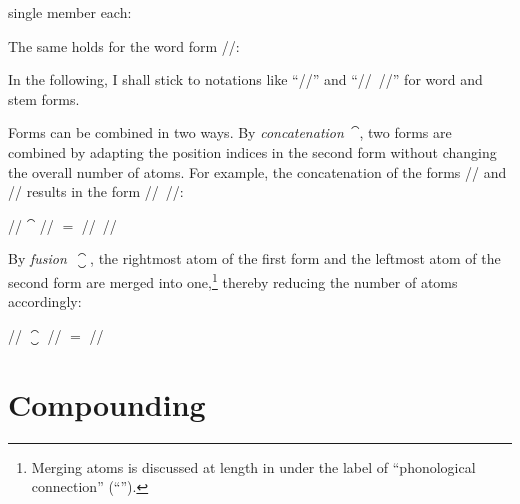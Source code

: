 \documentclass[output=paper
  ,nobabel
  ,draftmode
  ,colorlinks, citecolor=brown
]{langscibook}
\begin{document}
single member each: \begin{exe}
\ex {}
\end{exe}
\begin{exe}
\ex {}
\end{exe} The same holds for the word form //: \begin{exe}
\ex {}
\end{exe} 
In the following, I shall stick to notations like ``//'' and ``// //'' for word and stem forms.

\largerpage
Forms can be combined in two ways. By \emph{concatenation} $⁀$, two forms are combined by adapting the position indices in the
second form without changing the overall number of atoms. For example, the
concatenation of the forms // and // results in the form // //: \begin{exe}
\ex \raggedright
// $⁀$ // $=$ // //
\end{exe} 
By \emph{fusion} $⁐$, the rightmost atom of the first form and the leftmost atom of the
second form are merged into one,\footnote{Merging atoms is discussed at length in
\citet{lieb:1999:morph:wort} under the label of
``phonological connection'' (``'').} thereby reducing the number of atoms accordingly:
\begin{exe}
\ex \raggedright
// $⁐$ // $=$ //
\end{exe}

\section{Compounding}
\label{section.comp}
\end{document}
